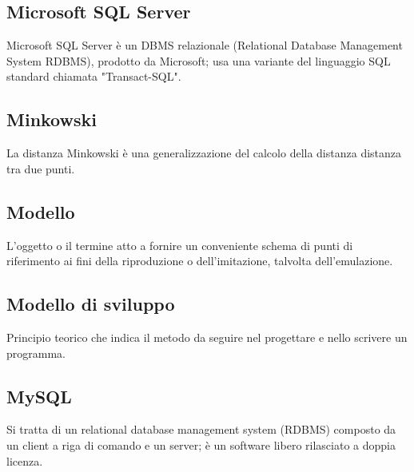 \documentclass[../glossario.tex]{subfiles}
\begin{document}
\subsection*{Microsoft SQL Server}
{}
Microsoft SQL Server è un DBMS relazionale (Relational Database Management System RDBMS), prodotto da Microsoft; usa una variante del linguaggio SQL standard chiamata "Transact-SQL".

\subsection*{Minkowski}
{}
La distanza Minkowski è una generalizzazione del calcolo della distanza distanza tra due punti.

\subsection*{Modello}
{}
L'oggetto o il termine atto a fornire un conveniente schema di punti di riferimento ai fini della riproduzione o dell'imitazione, talvolta dell'emulazione.

\subsection*{Modello di sviluppo}
{}
Principio teorico che indica il metodo da seguire nel progettare e nello scrivere un programma.

\subsection*{MySQL}
{}
Si tratta di un relational database management system (RDBMS) composto da un client a riga di comando e un server; è un software libero rilasciato a doppia licenza.
\end{document}
